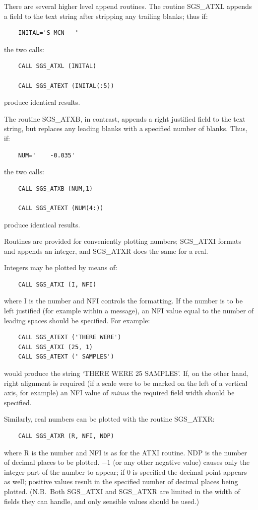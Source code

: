 \documentclass[11pt]{article}
\newcommand{\htmlref}[2]{#1}
\begin{document}
There are several higher level append routines.
The routine \htmlref{SGS\_ATXL}{SGS_ATXL}
appends a field to the text string after stripping any trailing
blanks;  thus if:
\begin{verbatim}
    INITAL='S MCN   '
\end{verbatim}
the two calls:
\begin{verbatim}
    CALL SGS_ATXL (INITAL)

    CALL SGS_ATEXT (INITAL(:5))
\end{verbatim}
produce identical results.

The routine 
\htmlref{SGS\_ATXB}{SGS_ATXB}, in contrast, appends a right justified
field to the text string, but replaces any leading blanks with a
specified number of blanks.  Thus, if:
\begin{verbatim}
    NUM='    -0.035'
\end{verbatim}
the two calls:
\begin{verbatim}
    CALL SGS_ATXB (NUM,1)

    CALL SGS_ATEXT (NUM(4:))
\end{verbatim}
produce identical results.

Routines are provided for conveniently plotting numbers;  
\htmlref{SGS\_ATXI}{SGS_ATXI}
formats and appends an integer, and 
\htmlref{SGS\_ATXR}{SGS_ATXR} does the same for a
real.

Integers may be plotted by means of:
\begin{verbatim}
    CALL SGS_ATXI (I, NFI)
\end{verbatim}
where I is the number and NFI controls the formatting.  If the number
is to be left justified (for example within a message), an NFI value
equal to the number of leading spaces should be specified.  For
example:
\begin{verbatim}
    CALL SGS_ATEXT ('THERE WERE')
    CALL SGS_ATXI (25, 1)
    CALL SGS_ATEXT (' SAMPLES')
\end{verbatim}
would produce the string `THERE WERE 25 SAMPLES'.  If, on
the other hand, right alignment is required (if a
scale were to be marked
on the left of a vertical axis, for example) an NFI value of {\em minus}\/
the required field width should be specified.

Similarly, real numbers can be plotted with the routine SGS\_ATXR:
\begin{verbatim}
    CALL SGS_ATXR (R, NFI, NDP)
\end{verbatim}
where R is the number and NFI is as for the ATXI routine.  NDP is
the number of decimal places to be plotted.  $-1$ (or any other negative
value) causes only the integer part of the number to appear;  if 0 is
specified the decimal point appears as well;  positive values result
in the specified number of decimal places being plotted.
(N.B.\ Both SGS\_ATXI and SGS\_ATXR are limited in the width of fields they
can handle, and only sensible values should be used.)
\end{document}
